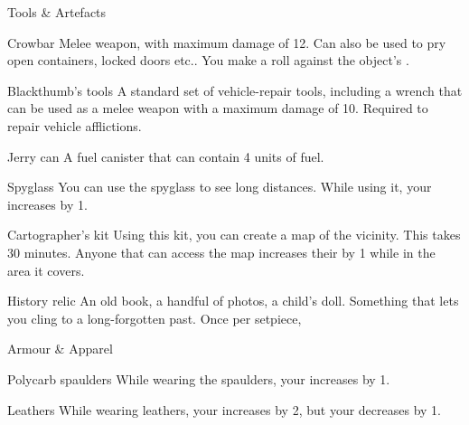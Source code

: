 \begin{abstractsection}{Tools \& Artefacts}
\vspace{1ex}

\begin{describe}{Crowbar}
  Melee weapon, with maximum damage of 12. Can also be used to pry open containers, locked doors etc.. You make a  roll against the object's .
\end{describe}

\begin{describe}{Blackthumb's tools}
  A standard set of vehicle-repair tools, including a wrench that can be used as a melee weapon with a maximum damage of 10. Required to repair vehicle afflictions.
\end{describe}

\begin{describe}{Jerry can}
  A fuel canister that can contain 4 units of fuel.
\end{describe}

\begin{describe}{Spyglass}
  You can use the spyglass to see long distances. While using it, your  increases by 1.
\end{describe}

\begin{describe}{Cartographer's kit}
  Using this kit, you can create a map of the vicinity. This takes 30 minutes. Anyone that can access the map increases their  by 1 while in the area it covers.
\end{describe}

\begin{describe}{History relic}
  An old book, a handful of photos, a child's doll. Something that lets you cling to a long-forgotten past. Once per setpiece, 
\end{describe}
\end{abstractsection}

\begin{abstractsection}{Armour \& Apparel}
\vspace{1ex}

\begin{describe}{Polycarb spaulders}
  While wearing the spaulders, your  increases by 1.
\end{describe}

\begin{describe}{Leathers}
  While wearing leathers, your  increases by 2, but your  decreases by 1.
\end{describe}
\end{abstractsection}
